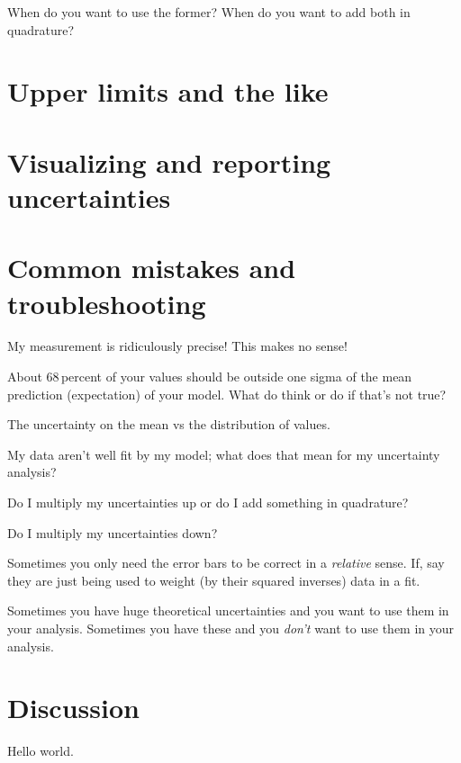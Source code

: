 \documentclass[10pt]{article}
\begin{document}
When do you want to use the former? When do you want to add both in quadrature?

\section{Upper limits and the like}

\section{Visualizing and reporting uncertainties}

\section{Common mistakes and troubleshooting}

My measurement is ridiculously precise! This makes no sense!

About 68\,percent of your values should be outside one sigma of the
mean prediction (expectation) of your model. What do think or do if
that's not true?

The uncertainty on the mean vs the distribution of values.

My data aren't well fit by my model; what does that mean for my uncertainty
analysis?

Do I multiply my uncertainties up or do I add something in quadrature?

Do I multiply my uncertainties down?

Sometimes you only need the error bars to be correct in a
\emph{relative} sense. If, say they are just being used to weight (by
their squared inverses) data in a fit.

Sometimes you have huge theoretical uncertainties and you want to use
them in your analysis. Sometimes you have these and you \emph{don't} want
to use them in your analysis.

\section{Discussion}

Hello world.

\clearpage\raggedright

\end{document}
